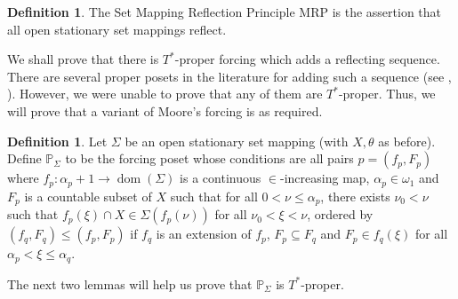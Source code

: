 \documentclass{amsart}
\theoremstyle{definition}
\newtheorem{definition}[theorem]{Definition}
\newcommand{\al}{\omega_1}
\newcommand{\MRP}{\mathrm{MRP}}
\DeclareMathOperator{\dom}{dom}
\begin{document}
\begin{definition}
The Set Mapping Reflection Principle  $\MRP$ is the assertion that all open stationary set mappings reflect.
\end{definition}
 We shall prove that there is $T^*$-proper forcing which adds a reflecting sequence. There are several proper posets in the literature for adding such a sequence (see \cite{Moore2005}, \cite{Moh2021}). However, we were unable to prove that any of them are $T^*$-proper. Thus, we will prove that a  variant of Moore's forcing is as required.
\begin{definition}
    Let $\Sigma$ be an open stationary set mapping (with $X, \theta$ as before). Define $\mathbb{P}_\Sigma$ to be the forcing poset whose conditions are all pairs $p=(f_p  ,F_p)$ where  $f_p:\alpha_p+1\to \dom(\Sigma)$ is a continuous   $\in$-increasing map, $\alpha_p\in\al$  and $F_p$ is a countable subset of $X$ such that for all  $0<\nu\leq\alpha_p$, there exists $\nu_0<\nu $ such that $f_p(\xi)\cap X\in \Sigma(f_p(\nu))$ for all $\nu_0<\xi<\nu$, ordered by $(f_q, F_q) \leq (f_p, F_p) $ if $f_q$ is an extension of $f_p$, $F_p\subseteq F_q$ and $F_p\in f_q(\xi)$ for all $\alpha_p<\xi\leq \alpha_q$.
\end{definition}
 The next two lemmas will help us prove that $\mathbb{P}_\Sigma$ is $T^*$-proper.
\end{document}
